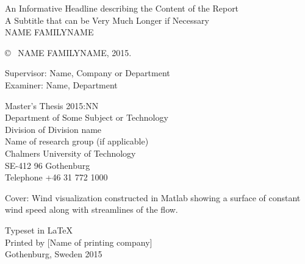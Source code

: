 \newpage
\thispagestyle{plain}
\vspace*{4.5cm}
An Informative Headline describing the Content of the Report\\
A Subtitle that can be Very Much Longer if Necessary\\
NAME FAMILYNAME \setlength{\parskip}{1cm}

\copyright ~ NAME FAMILYNAME, 2015. \setlength{\parskip}{1cm}

Supervisor: Name, Company or Department\\
Examiner: Name, Department \setlength{\parskip}{1cm}

Master's Thesis 2015:NN\\	%
Department of Some Subject or Technology\\
Division of Division name\\
Name of research group (if applicable)\\
Chalmers University of Technology\\
SE-412 96 Gothenburg\\
Telephone +46 31 772 1000 \setlength{\parskip}{0.5cm}

\vfill
Cover: Wind visualization constructed in Matlab showing a surface of constant wind speed along with streamlines of the flow. \setlength{\parskip}{0.5cm}

Typeset in \LaTeX \\
Printed by [Name of printing company]\\
Gothenburg, Sweden 2015

